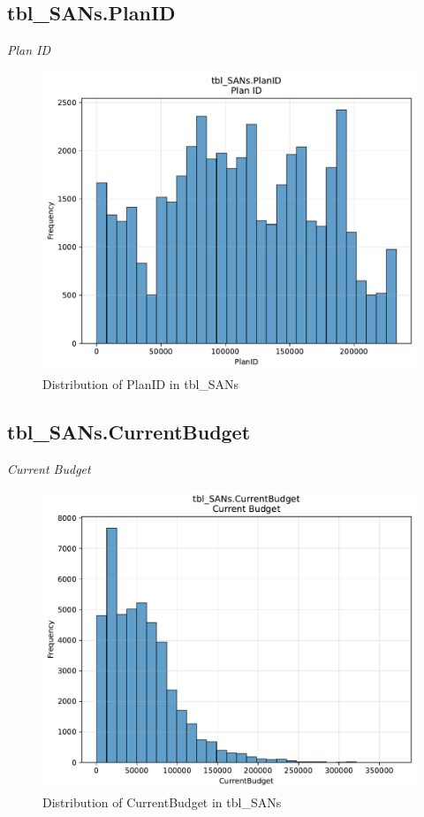 \subsection{tbl\_SANs.PlanID}
\textit{Plan ID}

\begin{figure}[htbp]
\centering
\includegraphics[width=\textwidth]{figures/dbo_tbl_SANs_PlanID.pdf}
\caption{Distribution of PlanID in tbl\_SANs}
\end{figure}\newpage

\subsection{tbl\_SANs.CurrentBudget}
\textit{Current Budget}

\begin{figure}[htbp]
\centering
\includegraphics[width=\textwidth]{figures/dbo_tbl_SANs_CurrentBudget.pdf}
\caption{Distribution of CurrentBudget in tbl\_SANs}
\end{figure}\newpage

